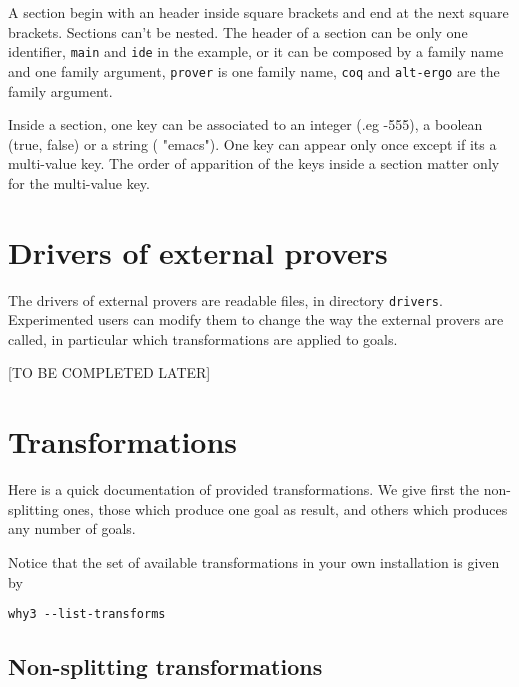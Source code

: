 A section begin with an header inside square brackets and end at the
next square brackets. Sections can't be nested. The header of a
section can be only one identifier, \texttt{main} and \texttt{ide} in
the example, or it can be composed by a family name and one family
argument, \texttt{prover} is one family name, \texttt{coq} and
\texttt{alt-ergo} are the family argument.

Inside a section, one key can be associated to an integer (.eg -555),
a boolean (true, false) or a string (\eg{} "emacs"). One key can appear
only once except if its a multi-value key. The order of apparition of
the keys inside a section matter only for the multi-value key.

\section{Drivers of external provers}

The drivers of external provers are readable files, in directory
\texttt{drivers}. Experimented users can modify them to change the way
the external provers are called, in particular which transformations
are applied to goals.

[TO BE COMPLETED LATER]

\section{Transformations}
\label{sec:transformations}

Here is a quick documentation of provided transformations. We give
first the non-splitting ones, \eg{} those which produce one goal as
result, and others which produces any number of goals.

Notice that the set of available transformations in your own
installation is given by
\begin{verbatim}
why3 --list-transforms
\end{verbatim}

\subsection{Non-splitting transformations}

